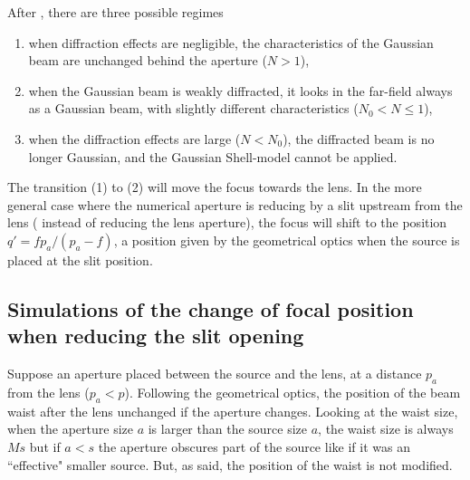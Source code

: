 \documentclass{iucr}              %
\begin{document}
After \cite{Belland:82}, there are three possible regimes 
\begin{enumerate}
\item when diffraction effects are negligible, the
characteristics of the Gaussian beam are unchanged
behind the aperture ($N>1$),
\item when the Gaussian
beam is weakly diffracted, it looks in the far-field always as a Gaussian beam, with slightly different characteristics ($N_0<N \le 1$),
\item when the diffraction effects are large ($N<N_0$),
the diffracted beam is no longer Gaussian, and the Gaussian Shell-model cannot be applied.
\end{enumerate}

The transition (1) to (2) will move the focus towards the lens. In the more general case where the numerical aperture is reducing by a slit upstream from the lens ( instead of reducing the lens aperture), the focus will shift to the position $q'=f p_a/(p_a-f)$, a position given by the geometrical optics when the source is placed at the slit position.
 
 
 \subsection{Simulations of the change of focal position when reducing the slit opening}
 
Suppose an aperture placed between the source and the lens, at a distance $p_a$ from the lens ($p_a < p$). Following the geometrical optics, the position of the beam waist after the lens unchanged if the aperture changes. Looking at the waist size, when the aperture size $a$ is larger than the source size $a$, the waist size is always $Ms$ but if $a<s$ the aperture obscures part of the source like if it was an ``effective" smaller source. But, as said, the position of the waist is not modified. 

\end{document}
